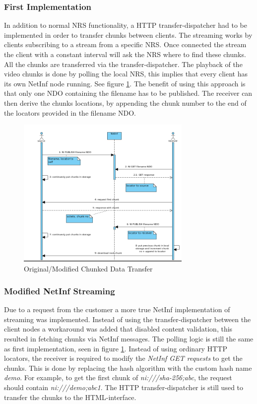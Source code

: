 \subsubsection{First Implementation}
In addition to normal NRS functionality, a HTTP transfer-dispatcher had to be implemented in order to transfer 
chunks between clients. The streaming works by clients subscribing to a stream from a specific NRS. Once connected the 
stream the client with a constant interval will ask the NRS where to find these chunks. All the chunks are transferred 
via the transfer-dispatcher.
The playback of the video chunks is done by polling the local NRS, this implies that every client has its own NetInf 
node running. See figure \ref{fig:stream-seqorgmod}. The benefit of using this approach is that only one NDO containing the 
filename has to be published. The receiver can then derive the chunks locations, by appending the chunk number to the end of 
the locators provided in the filename NDO.

\begin{figure}[h!]
	\centering
		\includegraphics[width=0.75\textwidth]{./img/sequence_diagram_streaming_orgmod.png}
    	\caption{Original/Modified Chunked Data Transfer}
	\label{fig:stream-seqorgmod}
\end{figure}

\subsubsection{Modified NetInf Streaming}
Due to a request from the customer a more true NetInf implementation of streaming was implemented. 
Instead of using the transfer-dispatcher between the client nodes a workaround was added that disabled 
content validation, this resulted in fetching chunks via NetInf messages. The polling logic is still the 
same as first implementation, seen in figure \ref{fig:stream-seqorgmod}. Instead of using ordinary HTTP locators, the 
receiver is required to modify the \textit{NetInf GET requests} to get the chunks. This is done by replacing the 
hash algorithm with the custom hash name \textit{demo}. For example, to get the first chunk of \textit{ni:///sha-256;abc}, 
the request should contain \textit{ni:///demo;abc1}. The HTTP transfer-dispatcher is still used to transfer the chunks to the HTML-interface.

